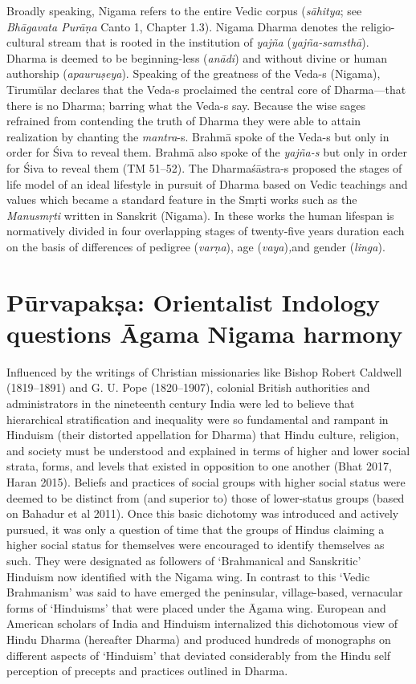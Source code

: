 Broadly speaking, Nigama refers to the entire Vedic corpus (\textit{sāhitya}; see \textit{Bhāgavata Purāṇa} Canto 1, Chapter 1.3). Nigama Dharma denotes the religio-cultural stream that is rooted in the institution of \textit{yajña} (\textit{yajña-samsthā}). Dharma is deemed to be beginning-less (\textit{anādi}) and without divine or human authorship (\textit{apauruṣeya}). Speaking of the greatness of the Veda-s (Nigama), Tirumūlar declares that the Veda-s proclaimed the central core of Dharma—that there is no Dharma; barring what the Veda-s say. Because the wise sages refrained from contending the truth of Dharma they were able to attain realization by chanting the \textit{mantra}-s. Brahmā spoke of the Veda-s but only in order for Śiva to reveal them. Brahmā also spoke of the \textit{yajña-s} but only in order for Śiva to reveal them (TM 51–52). The Dharmaśāstra-s proposed the stages of life model of an ideal lifestyle in pursuit of Dharma based on Vedic teachings and values which became a standard feature in the Smṛti works such as the \textit{Manusmṛti}  written in Sanskrit (Nigama). In these works the human lifespan is normatively divided in four overlapping stages of twenty-five years duration each on the basis of differences of pedigree (\textit{varṇa}), age (\textit{vaya})\textit{,}and gender (\textit{linga}).


\section*{Pūrvapakṣa: Orientalist Indology questions Āgama Nigama harmony}

Influenced by the writings of Christian missionaries like Bishop Robert Caldwell (1819–1891) and G. U. Pope (1820–1907), colonial British authorities and administrators in the nineteenth century India were led to believe that hierarchical stratification and inequality were so fundamental and rampant in Hinduism (their distorted appellation for Dharma) that Hindu culture, religion, and society must be understood and explained in terms of higher and lower social strata, forms, and levels that existed in opposition to one another (Bhat 2017, Haran 2015). Beliefs and practices of social groups with higher social status were deemed to be distinct from (and superior to) those of lower-status groups (based on Bahadur et al 2011). Once this basic dichotomy was introduced and actively pursued, it was only a question of time that the groups of Hindus claiming a higher social status for themselves were encouraged to identify themselves as such. They were designated as followers of ‘Brahmanical and Sanskritic’ Hinduism now identified with the Nigama wing. In contrast to this ‘Vedic Brahmanism’ was said to have emerged the peninsular, village-based, vernacular forms of ‘Hinduisms’ that were placed under the Āgama wing. European and American scholars of India and Hinduism internalized this dichotomous view of Hindu Dharma (hereafter Dharma) and produced hundreds of monographs on different aspects of ‘Hinduism’ that deviated considerably from the Hindu self perception of precepts and practices outlined in Dharma.

